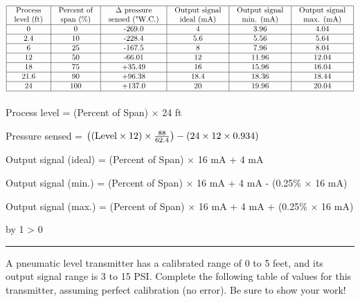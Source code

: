 \documentclass[12pt,a4paper]{article}
\def\oppgave{
            \advance\questnum by 1
            \ifnum \questnum > 0
                 \hrule
                 \vskip 3pt
                 \leftline{Oppgave \the\questnum}
                 \vskip 3pt \fi}
\begin{document}
$$\vbox{\offinterlineskip
\halign{\strut
\vrule \quad\hfil # \ \hfil & 
\vrule \quad\hfil # \ \hfil & 
\vrule \quad\hfil # \ \hfil & 
\vrule \quad\hfil # \ \hfil & 
\vrule \quad\hfil # \ \hfil & 
\vrule \quad\hfil # \ \hfil \vrule \cr
\noalign{\hrule}
%
Process & Percent of & $\Delta$ pressure & Output signal & Output signal & Output signal \cr
%
level (ft) & span (\%) & sensed ("W.C.) & ideal (mA) & min. (mA) & max. (mA) \cr
%
\noalign{\hrule}
%
0  & 0 & -269.0 & 4 & 3.96 & 4.04 \cr
%
\noalign{\hrule}
%
2.4  & 10 & -228.4 & 5.6 & 5.56 & 5.64 \cr
%
\noalign{\hrule}
%
6  & 25 & -167.5 & 8 & 7.96 & 8.04 \cr
%
\noalign{\hrule}
%
12  & 50 & -66.01 & 12 & 11.96 & 12.04 \cr
%
\noalign{\hrule}
%
18  & 75 & +35.49 & 16 & 15.96 & 16.04 \cr
%
\noalign{\hrule}
%
21.6  & 90 & +96.38 & 18.4 & 18.36 & 18.44 \cr
%
\noalign{\hrule}
%
24  & 100 & +137.0 & 20 & 19.96 & 20.04 \cr
%
\noalign{\hrule}
} %
}$$ %

\vskip 10pt

Process level = (Percent of Span) $\times$ 24 ft

\vskip 10pt

Pressure sensed = $\left( (\hbox{Level} \times 12) \times {88 \over 62.4} \right) - (24 \times 12 \times 0.934)$

\vskip 10pt

Output signal (ideal) = (Percent of Span) $\times$ 16 mA + 4 mA 

\vskip 10pt

Output signal (min.) = (Percent of Span) $\times$ 16 mA + 4 mA - (0.25\% $\times$ 16 mA) 

\vskip 10pt

Output signal (max.) = (Percent of Span) $\times$ 16 mA + 4 mA + (0.25\% $\times$ 16 mA) 

\vskip 10pt




\vfil \eject 



\oppgave{} 

A pneumatic level transmitter has a calibrated range of 0 to 5 feet, and its output signal range is 3 to 15 PSI.  Complete the following table of values for this transmitter, assuming perfect calibration (no error).  Be sure to show your work!
\end{document}
